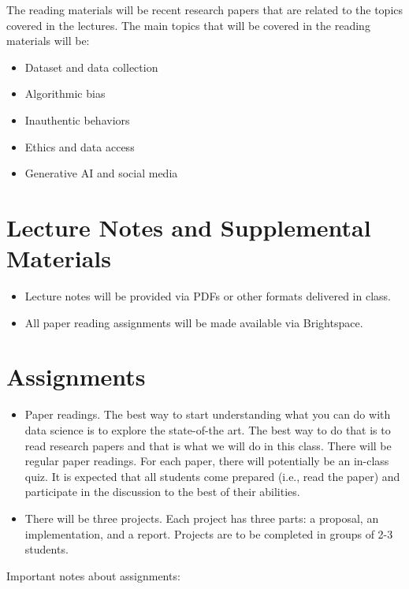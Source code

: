 \documentclass[11pt,article,oneside]{memoir} %
\begin{document}
The reading materials will be recent research papers that are related to the topics covered in the lectures.
The main topics that will be covered in the reading materials will be:

\begin{itemize}
    \item Dataset and data collection
    \item Algorithmic bias
    \item Inauthentic behaviors
    \item Ethics and data access
    \item Generative AI and social media
\end{itemize}


\section{Lecture Notes and Supplemental Materials}
\begin{itemize}
    \item Lecture notes will be provided via PDFs or other formats delivered in class.
    \item All paper reading assignments will be made available via Brightspace.
\end{itemize}


\section{Assignments}

\begin{itemize}
    \item Paper readings. The best way to start understanding what you can do with data science is
    to explore the state-of-the art. The best way to do that is to read research papers and that
    is what we will do in this class. There will be regular paper readings. For each paper,
    there will potentially be an in-class quiz.
    It is expected that all students come prepared (i.e., read the paper) and participate in the
    discussion to the best of their abilities.
    \item There will be three projects. Each project has three parts: a proposal, an implementation, and a report.
    Projects are to be completed in groups of 2-3 students.
\end{itemize}

Important notes about assignments:
\end{document}
